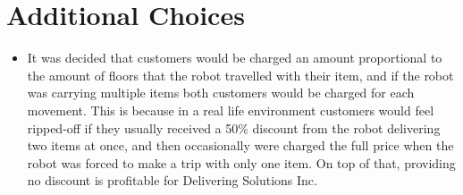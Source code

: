 \documentclass{article}
\begin{document}
\section{Additional Choices}
\begin{itemize}
    \item It was decided that customers would be charged an amount proportional to the amount of floors that the robot travelled with their item, and if the robot was carrying multiple items both customers would be charged for each movement. This is because in a real life environment customers would feel ripped-off if they usually received a 50\% discount from the robot delivering two items at once, and then occasionally were charged the full price when the robot was forced to make a trip with only one item. On top of that, providing no discount is profitable for Delivering Solutions Inc.
\end{itemize}
\end{document}
